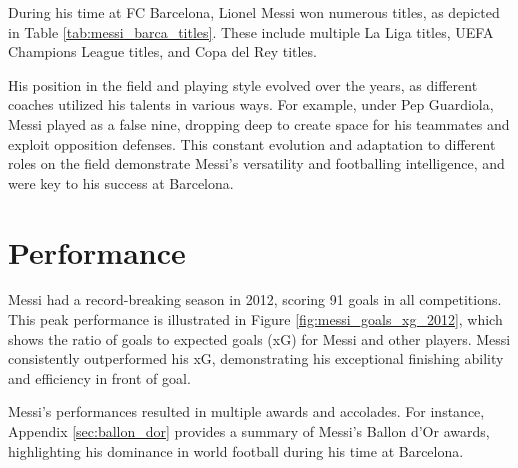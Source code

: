 During his time at FC Barcelona, Lionel Messi won numerous titles, as depicted
in Table \ref{tab:messi_barca_titles}.
These include multiple La Liga titles, UEFA Champions League titles, and Copa del Rey
titles.



His position in the field and playing style evolved over the years, as 
different coaches utilized his talents in various ways.
For example, under Pep Guardiola, Messi played as a false nine, dropping deep
to create space for his teammates and exploit opposition defenses.
This constant evolution and adaptation to different roles on the field
demonstrate Messi's versatility and footballing intelligence, and were 
key to his success at Barcelona.

\section{Performance}\label{sec:chap1_performance}

Messi had a record-breaking season in 2012, scoring 91 goals in all competitions.
This peak performance is illustrated in Figure \ref{fig:messi_goals_xg_2012}, which
shows the ratio of goals to expected goals (xG) for Messi and other players.
Messi consistently outperformed his xG, demonstrating his exceptional finishing
ability and efficiency in front of goal.



Messi's performances resulted in multiple awards and accolades.
For instance, Appendix \ref{sec:ballon_dor} provides a summary of Messi's Ballon 
d'Or awards, highlighting his dominance in world football during his time 
at Barcelona.


